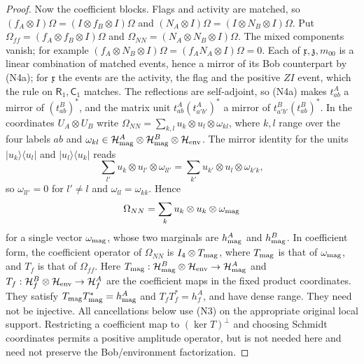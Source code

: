 \begin{proof}
Now the coefficient blocks. Flags and activity are matched, so $(f_A\otimes I)\Omega=(I\otimes f_B\otimes I)\Omega$ and $(N_A\otimes I)\Omega=(I\otimes N_B\otimes I)\Omega$. Put $\Omega_{ff}=(f_A\otimes f_B\otimes I)\Omega$ and $\Omega_{NN}=(N_A\otimes N_B\otimes I)\Omega$. The mixed components vanish; for example $(f_A\otimes N_B\otimes I)\Omega=(f_AN_A\otimes I)\Omega=0$. Each of $\mathfrak x,\mathfrak z,m_{00}$ is a linear combination of matched events, hence a mirror of its Bob counterpart by (N4a); for $\mathfrak x$ the events are the activity, the flag and the positive $ZI$ event, which the rule on $\mathsf R_1,\mathsf C_1$ matches. The reflections are self-adjoint, so (N4a) makes $t^A_{ab}$ a mirror of $(t^B_{ab})^*$, and the matrix unit $t^A_{ab}(t^A_{a'b'})^*$ a mirror of $t^B_{a'b'}(t^B_{ab})^*$. In the coordinates $U_A\otimes U_B$ write $\Omega_{NN}=\sum_{k,l}u_k\otimes u_l\otimes\omega_{kl}$, where $k,l$ range over the four labels $ab$ and $\omega_{kl}\in\mathcal H^A_{\rm mag}\otimes\mathcal H^B_{\rm mag}\otimes\mathcal H_{\rm env}$. The mirror identity for the units $|u_k\rangle\langle u_l|$ and $|u_l\rangle\langle u_k|$ reads
\[
 \sum_{l'}u_k\otimes u_{l'}\otimes\omega_{ll'}=\sum_{k'}u_{k'}\otimes u_l\otimes\omega_{k'k},
\]
so $\omega_{ll'}=0$ for $l'\ne l$ and $\omega_{ll}=\omega_{kk}$. Hence
\[
 \Omega_{NN}=\sum_ku_k\otimes u_k\otimes\omega_{\rm mag}
\]
for a single vector $\omega_{\rm mag}$, whose two marginals are $h^A_{\rm mag}$ and $h^B_{\rm mag}$. In coefficient form, the coefficient operator of $\Omega_{NN}$ is $I_4\otimes T_{\rm mag}$, where $T_{\rm mag}$ is that of $\omega_{\rm mag}$, and $T_f$ is that of $\Omega_{ff}$. Here $T_{\rm mag}:\mathcal H^B_{\rm mag}\otimes\mathcal H_{\rm env}
\to\mathcal H^A_{\rm mag}$ and
$T_f:\mathcal H^B_f\otimes\mathcal H_{\rm env}\to\mathcal H^A_f$
are the coefficient maps in the fixed product coordinates.
They satisfy $T_{\rm mag}T_{\rm mag}^*=h^A_{\rm mag}$ and
$T_fT_f^*=h^A_f$, and have dense range. They need not be injective.
All cancellations below use (N3) on the appropriate original local
support. Restricting a coefficient map to $(\ker T)^\perp$ and
choosing Schmidt coordinates permits a positive amplitude operator,
but is not needed here and need not preserve the Bob/environment
factorization.


\end{proof}
